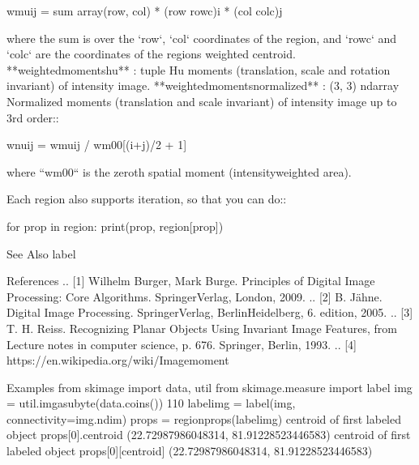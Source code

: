 \documentclass[letterpaper,10pt,english]{sphinxmanual}
\begin{document}
\begin{sphinxVerbatim}[commandchars=\\\{\}]
            wmu\PYGZus{}ij = sum\PYGZob{} array(row, col) * (row \PYGZhy{} row\PYGZus{}c)\PYGZca{}i * (col \PYGZhy{} col\PYGZus{}c)\PYGZca{}j \PYGZcb{}
    
        where the sum is over the `row`, `col` coordinates of the region,
        and `row\PYGZus{}c` and `col\PYGZus{}c` are the coordinates of the region\PYGZsq{}s weighted
        centroid.
    **weighted\PYGZus{}moments\PYGZus{}hu** : tuple
        Hu moments (translation, scale and rotation invariant) of intensity
        image.
    **weighted\PYGZus{}moments\PYGZus{}normalized** : (3, 3) ndarray
        Normalized moments (translation and scale invariant) of intensity
        image up to 3rd order::
    
            wnu\PYGZus{}ij = wmu\PYGZus{}ij / wm\PYGZus{}00\PYGZca{}[(i+j)/2 + 1]
    
        where ``wm\PYGZus{}00`` is the zeroth spatial moment (intensity\PYGZhy{}weighted area).
    
    Each region also supports iteration, so that you can do::
    
      for prop in region:
          print(prop, region[prop])
    
    See Also
    \PYGZhy{}\PYGZhy{}\PYGZhy{}\PYGZhy{}\PYGZhy{}\PYGZhy{}\PYGZhy{}\PYGZhy{}
    label
    
    References
    \PYGZhy{}\PYGZhy{}\PYGZhy{}\PYGZhy{}\PYGZhy{}\PYGZhy{}\PYGZhy{}\PYGZhy{}\PYGZhy{}\PYGZhy{}
    .. [1] Wilhelm Burger, Mark Burge. Principles of Digital Image Processing:
           Core Algorithms. Springer\PYGZhy{}Verlag, London, 2009.
    .. [2] B. Jähne. Digital Image Processing. Springer\PYGZhy{}Verlag,
           Berlin\PYGZhy{}Heidelberg, 6. edition, 2005.
    .. [3] T. H. Reiss. Recognizing Planar Objects Using Invariant Image
           Features, from Lecture notes in computer science, p. 676. Springer,
           Berlin, 1993.
    .. [4] https://en.wikipedia.org/wiki/Image\PYGZus{}moment
    
    Examples
    \PYGZhy{}\PYGZhy{}\PYGZhy{}\PYGZhy{}\PYGZhy{}\PYGZhy{}\PYGZhy{}\PYGZhy{}
    \PYGZgt{}\PYGZgt{}\PYGZgt{} from skimage import data, util
    \PYGZgt{}\PYGZgt{}\PYGZgt{} from skimage.measure import label
    \PYGZgt{}\PYGZgt{}\PYGZgt{} img = util.img\PYGZus{}as\PYGZus{}ubyte(data.coins()) \PYGZgt{} 110
    \PYGZgt{}\PYGZgt{}\PYGZgt{} label\PYGZus{}img = label(img, connectivity=img.ndim)
    \PYGZgt{}\PYGZgt{}\PYGZgt{} props = regionprops(label\PYGZus{}img)
    \PYGZgt{}\PYGZgt{}\PYGZgt{} \PYGZsh{} centroid of first labeled object
    \PYGZgt{}\PYGZgt{}\PYGZgt{} props[0].centroid
    (22.72987986048314, 81.91228523446583)
    \PYGZgt{}\PYGZgt{}\PYGZgt{} \PYGZsh{} centroid of first labeled object
    \PYGZgt{}\PYGZgt{}\PYGZgt{} props[0][\PYGZsq{}centroid\PYGZsq{}]
    (22.72987986048314, 81.91228523446583)
\end{sphinxVerbatim}
\end{document}
